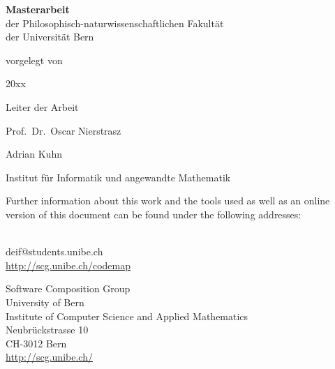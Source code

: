 \newcommand{\thesisemail}{deif@students.unibe.ch}
\newcommand{\thesisdate}{ 20xx}
\newcommand{\thesisurl}{\url{http://scg.unibe.ch/codemap}}

\title{\thesistitle}
\author{\thesisauthor, \thesisemail}
\date{\thesisdate}

\begin{titlepage}
  \begin{center}
    \thispagestyle{empty}
    {\bfseries\Huge\thesistitle \par}
    {\bfseries\Large\thesissubtitle \par}
    \vspace{1.1in}
    \large
    {\textbf{Masterarbeit} \\
    der Philosophisch-naturwissenschaftlichen Fakult\"{a}t \\
    der Universit\"{a}t Bern \par}
    \vspace{0.6in}
    vorgelegt von \par
     {\LARGE \thesisauthor \par}
    {\thesisdate \par}
    \vspace{1.1in}
    Leiter der Arbeit \par
    {Prof.\ Dr.\ Oscar Nierstrasz \par}
    {Adrian Kuhn \par}
    \vspace{0.6in}
    {Institut f\"ur Informatik und angewandte Mathematik \par}
  \end{center}
\end{titlepage}

\thispagestyle{empty}
\mbox{}
\vskip 10cm
\noindent Further information about this work and the tools used as well as an online version of this document can be found under the following addresses:
\vskip 11pt

\vskip 11pt
\noindent \thesisauthor\\
\thesisemail\\
\thesisurl\\
\vskip 11pt

\vskip 11pt
\noindent Software Composition Group\\
University of Bern\\
Institute of Computer Science and Applied Mathematics\\
Neubr\"uckstrasse 10\\
CH-3012 Bern\\
\url{http://scg.unibe.ch/}
